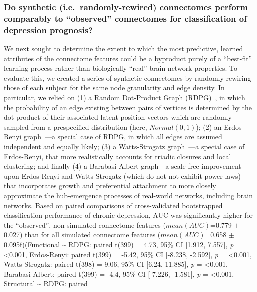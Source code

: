 \documentclass[
  notitlepage]{article}
\begin{document}
\hypertarget{do-synthetic-i.e.-randomly-rewired-connectomes-perform-comparably-to-observed-connectomes-for-classification-of-depression-prognosis}{%
\subsubsection{Do synthetic (i.e.~randomly-rewired) connectomes perform
comparably to ``observed'' connectomes for classification of depression
prognosis?}\label{do-synthetic-i.e.-randomly-rewired-connectomes-perform-comparably-to-observed-connectomes-for-classification-of-depression-prognosis}}
We next sought to determine the extent to which the most predictive,
learned attributes of the connectome features could be a byproduct
purely of a ``best-fit'' learning process rather than biologically
``real'' brain network properties. To evaluate this, we created a series
of synthetic connectomes by randomly rewiring those of each subject for
the same node granularity and edge density. In particular, we relied on
(1) a Random Dot-Product Graph (RDPG)~\cite{Young2007},
in which the probability of an edge existing between pairs of vertices
is determined by the dot product of their associated latent position
vectors which are randomly sampled from a prespecified distribution
(here, \(Normal(0, 1)\)); (2) an Erdos-Renyi
graph~\cite{Erdos1959}---a special case of RDPG, in
which all edges are assumed independent and equally likely; (3) a
Watts-Strogatz graph~\cite{Watts1998}---a special case
of Erdos-Renyi, that more realistically accounts for triadic closures
and local clustering; and finally (4) a Barabasi-Albert graph---a
scale-free improvement upon Erdos-Renyi and Watts-Strogatz (which do not
not exhibit power laws) that incorporates growth and preferential
attachment to more closely approximate the hub-emergence processes of
real-world networks, including brain networks. Based on paired
comparisons of cross-validated bootstrapped classification performance
of chronic depression, AUC was significantly higher for the
``observed'', non-simulated connectome features (\(mean(AUC)\)=0.779
\(\pm\) 0.027) than for all simulated connectome features
(\(mean(AUC)\)=0.658 \(\pm\) 0.095f)(Functional \textasciitilde{} RDPG:
paired t(399) = 4.73, 95\% CI {[}1.912, 7.557{]}, \emph{p} =
\textless0.001, Erdos-Renyi: paired t(399) = -5.42, 95\% CI {[}-8.238,
-2.592{]}, \emph{p} = \textless0.001, Watts-Strogatz: paired t(398) =
9.06, 95\% CI {[}6.24, 11.885{]}, \emph{p} = \textless0.001,
Barabasi-Albert: paired t(399) = -4.4, 95\% CI {[}-7.226, -1.581{]},
\emph{p} = \textless0.001, Structural \textasciitilde{} RDPG: paired
\end{document}
